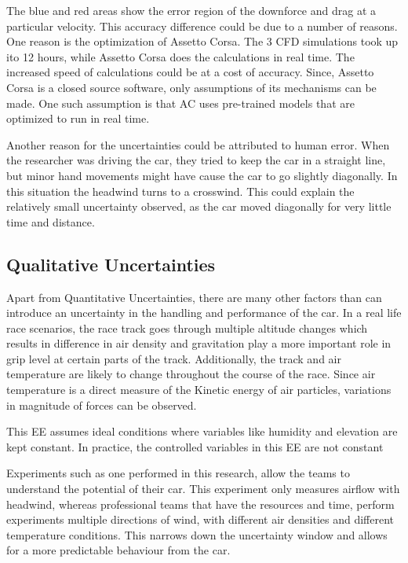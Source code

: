 \documentclass[11pt, a4paper]{article}
\begin{document}
The blue and red areas show the error region of the downforce and drag at a particular velocity. 
This accuracy difference could be due to a number of reasons. One reason is the optimization of Assetto Corsa. The 3 CFD simulations took up 
ito 12 hours, while Assetto Corsa does the calculations in real time.
The increased speed of calculations could be at a cost of accuracy. Since, Assetto Corsa is a closed source software, only assumptions of its mechanisms can be made. One such assumption is that AC uses pre-trained models
that are optimized to run in real time. 

Another reason for the uncertainties could be attributed to human error. When the researcher was driving the car, they tried to keep the car in a straight line, but minor hand movements might have cause the car to go slightly diagonally.
In this situation the headwind turns to a crosswind. This could explain the relatively small uncertainty observed, as the car moved diagonally for very little time and distance.

\subsection{Qualitative Uncertainties}
Apart from Quantitative Uncertainties, there are many other factors than can introduce an uncertainty in the handling and performance of the car. In a real life race scenarios, the race track goes through multiple 
altitude changes which results in difference in air density and gravitation play a more important role in grip level at certain parts of the track. Additionally, the track and air temperature are likely to change throughout the course of
the race. Since air temperature is a direct measure of the Kinetic energy of air particles, variations in magnitude of forces can be observed. 

This EE assumes ideal conditions where variables like humidity and elevation are kept constant. In practice, the controlled variables in this EE are not constant

Experiments such as one performed in this research, allow the teams to understand the potential of their car. This experiment only measures airflow with headwind, whereas professional teams that have the resources and time, perform experiments multiple directions of wind, with different air densities
and different temperature conditions. This narrows down the uncertainty window and allows for a more predictable behaviour from the car. 
\end{document}
